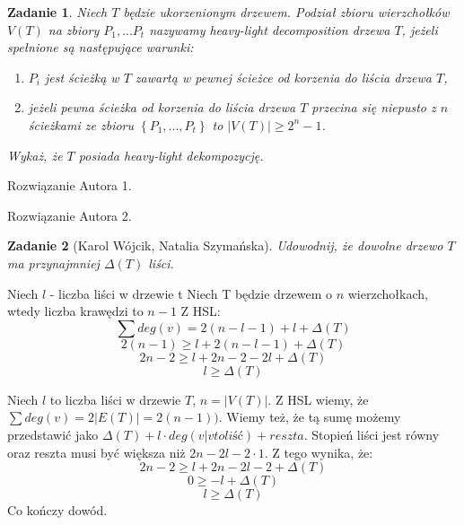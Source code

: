 \documentclass{mwart}
\newtheorem{zad}{Zadanie}[section]
\begin{document}
\begin{zad}
    Niech $T$ będzie ukorzenionym drzewem. Podział zbioru wierzchołków $V(T)$ na zbiory $P_1, ... P_t$ nazywamy
    heavy-light decomposition drzewa $T$, jeżeli spełnione są następujące warunki:
    \begin{enumerate}
        \item  $P_i$ jest ścieżką w $T$ zawartą w pewnej ścieżce od korzenia do liścia drzewa $T$,
        \item  jeżeli pewna ścieżka od korzenia do liścia drzewa $T$ przecina się niepusto z $n$ ścieżkami
              ze zbioru $\left\{P_1, ..., P_t\right\}$ to $|V(T)| \geq 2^n-1$.
    \end{enumerate}
    Wykaż, że $T$ posiada heavy-light dekompozycję.
\end{zad}
\begin{mdframed}
    Rozwiązanie Autora 1.
\end{mdframed}
\begin{mdframed}
    Rozwiązanie Autora 2.
\end{mdframed}


\begin{zad}[Karol Wójcik, Natalia Szymańska]
    Udowodnij, że dowolne drzewo $T$ ma przynajmniej $\Delta(T)$ liści.
\end{zad}
\begin{mdframed}
    Niech $l$ - liczba liści w drzewie t
    \newline\newline
    Niech T będzie drzewem o $n$ wierzchołkach, wtedy liczba krawędzi to $n-1$
    \newline\newline
    Z HSL:
    \[
    \sum deg(v) = 2(n-l-1) + l + \Delta(T)
    \]
    \[
    2(n-1) \geqslant l + 2(n-l-1) + \Delta(T)
    \]
    \[
    2n-2 \geqslant l + 2n - 2 -2l + \Delta(T)
    \]
    \[
    l \geqslant \Delta(T)
    \]
\end{mdframed}
\begin{mdframed}
    Niech $l$ to liczba liści w drzewie $T$, $n = |V(T)|$.
Z HSL wiemy, że $\sum deg(v) = 2|E(T)| = 2(n-1))$. Wiemy też, że tą sumę możemy przedstawić jako $\Delta(T) + l \cdot deg(v | v to liść) + reszta$. Stopień liści jest równy oraz  reszta musi być większa niż $2n - 2l -2\cdot 1$.
Z tego wynika, że:
\[2n - 2\geq l + 2n-2l-2 +\Delta(T)\]
\[0\geq -l+\Delta(T)\]
\[l \geq \Delta(T)\]
Co kończy dowód.
\end{mdframed}
\end{document}
